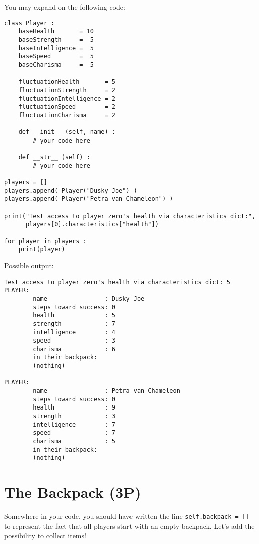 \documentclass[
	english,
	fontsize=10pt,
	parskip=half,
	titlepage=true,
	DIV=12
]{scrartcl}
\begin{document}
You may expand on the following code:
\begin{verbatim}
class Player :
    baseHealth       = 10
    baseStrength     =  5
    baseIntelligence =  5
    baseSpeed        =  5
    baseCharisma     =  5

    fluctuationHealth       = 5
    fluctuationStrength     = 2
    fluctuationIntelligence = 2
    fluctuationSpeed        = 2
    fluctuationCharisma     = 2

    def __init__ (self, name) :
        # your code here
    
    def __str__ (self) :
        # your code here

players = []
players.append( Player("Dusky Joe") )
players.append( Player("Petra van Chameleon") )

print("Test access to player zero's health via characteristics dict:",
      players[0].characteristics["health"])

for player in players :
    print(player)
\end{verbatim}

Possible output:
\begin{verbatim}
Test access to player zero's health via characteristics dict: 5
PLAYER:
        name                : Dusky Joe
        steps toward success: 0
        health              : 5
        strength            : 7
        intelligence        : 4
        speed               : 3
        charisma            : 6
        in their backpack:
        (nothing)

PLAYER:
        name                : Petra van Chameleon
        steps toward success: 0
        health              : 9
        strength            : 3
        intelligence        : 7
        speed               : 7
        charisma            : 5
        in their backpack:
        (nothing)
\end{verbatim}


\section{The Backpack (3\;P)}
Somewhere in your code, you should have written the line \texttt{self.backpack = []} to represent the fact that all players start with an empty backpack. Let's add the possibility to collect items!
\end{document}
